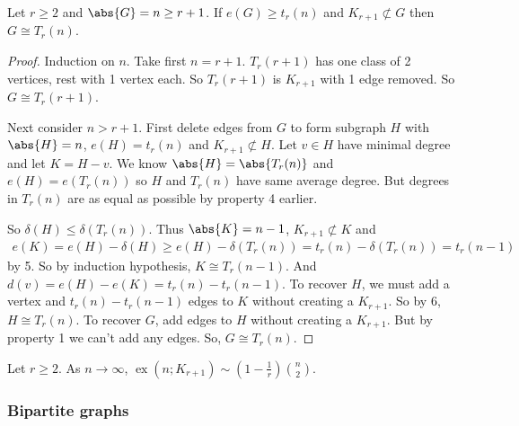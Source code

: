 \documentclass{article}
\DeclareMathOperator{\ext}{ex}
\begin{document}
\begin{nthm}\label{thm:9}
    Let $r \geq 2$ and $\abs{G} = n \geq r+1$. If $e(G) \geq t_r(n)$ and $K_{r+1} \not\subset G$ then $G \cong T_r(n)$.
\end{nthm}
\begin{proof}
    Induction on $n$.
    Take first $n = r+1$. $T_r(r+1)$ has one class of 2 vertices, rest with 1 vertex each. So $T_r(r+1)$ is $K_{r+1}$ with 1 edge removed. So $G \cong T_r(r+1)$.

    Next consider $n > r+1$. First delete edges from $G$ to form subgraph $H$ with $\abs{H} = n$, $e(H) = t_r(n)$ and $K_{r+1} \not \subset H$. Let $v \in H$ have minimal degree and let $K = H- v$.
    We know $\abs{H} = \abs{T_r(n)}$ and $e(H) = e(T_r(n))$ so $H$ and $T_r(n)$ have same average degree. But degrees in $T_r(n)$ are as equal as possible by property 4 earlier.

    So $\delta(H) \leq \delta(T_r(n))$. Thus $\abs{K} = n-1$, $K_{r+1} \not\subset K$ and \begin{align*}e(K) = e(H) - \delta (H) \geq e(H) - \delta(T_r(n)) = t_r(n) - \delta(T_r(n)) = t_r(n-1)\end{align*} by 5.
    So by induction hypothesis, $K \cong T_r(n-1)$. And $d(v) = e(H) - e(K) = t_r(n) - t_r(n-1)$.
    To recover $H$, we must add a vertex and $t_r(n) - t_r(n-1)$ edges to $K$ without creating a $K_{r+1}$. So by 6, $H \cong T_r(n)$.
    To recover $G$, add edges to $H$ without creating a $K_{r+1}$. But by property 1 we can't add any edges. So, $G \cong T_r(n)$.
\end{proof}







\begin{ncor}\label{cor:10}
    Let $r \geq 2$. As $n \to \infty$, $\ext(n; K_{r+1}) \sim (1 - \frac{1}{r}) \binom{n}{2}$.
\end{ncor}
\subsubsection{Bipartite graphs}
\end{document}
